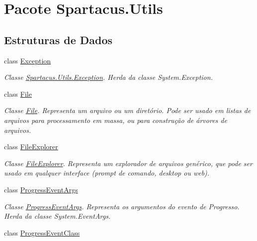 \hypertarget{namespaceSpartacus_1_1Utils}{\section{Pacote Spartacus.\+Utils}
\label{namespaceSpartacus_1_1Utils}
}
\subsection*{Estruturas de Dados}
\begin{DoxyCompactItemize}
\item 
class \hyperlink{classSpartacus_1_1Utils_1_1Exception}{Exception}
\begin{DoxyCompactList}\small\item\em Classe \hyperlink{classSpartacus_1_1Utils_1_1Exception}{Spartacus.\+Utils.\+Exception}. Herda da classe System.\+Exception. \end{DoxyCompactList}\item 
class \hyperlink{classSpartacus_1_1Utils_1_1File}{File}
\begin{DoxyCompactList}\small\item\em Classe \hyperlink{classSpartacus_1_1Utils_1_1File}{File}. Representa um arquivo ou um diretório. Pode ser usado em listas de arquivos para processamento em massa, ou para construção de árvores de arquivos. \end{DoxyCompactList}\item 
class \hyperlink{classSpartacus_1_1Utils_1_1FileExplorer}{File\+Explorer}
\begin{DoxyCompactList}\small\item\em Classe \hyperlink{classSpartacus_1_1Utils_1_1FileExplorer}{File\+Explorer}. Representa um explorador de arquivos genérico, que pode ser usado em qualquer interface (prompt de comando, desktop ou web). \end{DoxyCompactList}\item 
class \hyperlink{classSpartacus_1_1Utils_1_1ProgressEventArgs}{Progress\+Event\+Args}
\begin{DoxyCompactList}\small\item\em Classe \hyperlink{classSpartacus_1_1Utils_1_1ProgressEventArgs}{Progress\+Event\+Args}. Representa os argumentos do evento de Progresso. Herda da classe System.\+Event\+Args. \end{DoxyCompactList}\item 
class \hyperlink{classSpartacus_1_1Utils_1_1ProgressEventClass}{Progress\+Event\+Class}

\end{DoxyCompactItemize}
